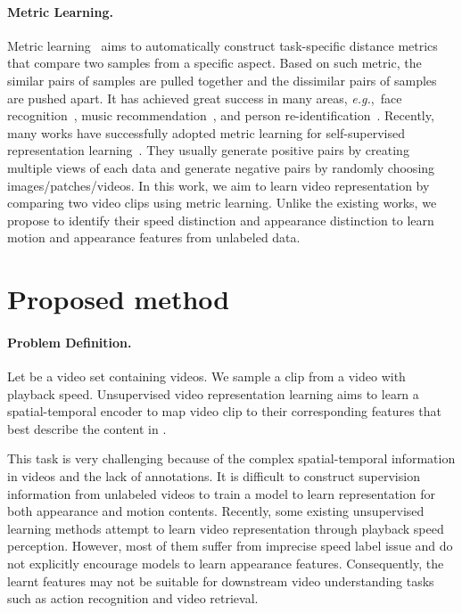 \documentclass[final]{cvpr}
\def\eg{\mbox{\textit{e.g.}, }}
\begin{document}
\vspace{-5mm}

\paragraph{Metric Learning.}
	Metric learning~\cite{xing2002metric} aims to automatically construct task-specific distance metrics that compare two samples from a specific aspect. Based on such metric, the similar pairs of samples are pulled together and the dissimilar pairs of samples are pushed apart.
	It has achieved great success in many areas, \eg face recognition~\cite{tripletloss}, music recommendation~\cite{McFee2012music}, and person re-identification~\cite{yang2018reid}. 
	Recently, many works have successfully adopted metric learning for self-supervised representation learning~\cite{wu2018unsupervised,he2019momentum,tian2019contrastive}. They usually generate positive pairs by creating multiple views of each data and generate negative pairs by randomly choosing images/patches/videos. In this work, we aim to learn video representation by comparing two video clips using metric learning. Unlike the existing works, we propose to identify their speed distinction and appearance distinction to learn motion and appearance features from unlabeled data.





	\section{Proposed method}
\label{sec:Method}

\paragraph{Problem Definition.}
Let  be a video set containing  videos. We sample a clip  from a video with  playback speed.
Unsupervised video representation learning aims to learn a spatial-temporal encoder  to map video clip  to their corresponding features  that best describe the content in .

This task is very challenging because of the complex spatial-temporal information in videos and the lack of annotations. 
It is difficult to construct supervision information from unlabeled videos  to train a model to learn representation for both appearance and motion contents.
Recently, some existing unsupervised learning methods attempt to learn video representation through playback speed perception. However, most of them suffer from imprecise speed label issue and do not explicitly encourage models to learn appearance features. Consequently, the learnt features may not be suitable for downstream video understanding tasks such as action recognition and video retrieval.
\end{document}
